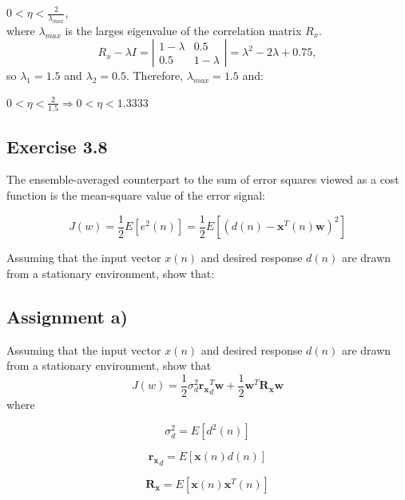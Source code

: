 \documentclass[a4paper, 12pt]{article}
\begin{document}
$0 < \eta < \frac{2}{\lambda_{max}}$,\\
where $\lambda_{max}$ is the larges eigenvalue of the correlation matrix $R_x$.\\

 \[ R_x - \lambda I = \left| \begin{array}{ccc}
1 - \lambda & 0.5 \\
0.5 & 1 - \lambda \end{array} \right| = \lambda^2 - 2\lambda + 0.75,\]
so $\lambda_1 = 1.5$ and $\lambda_2 = 0.5$. Therefore, $\lambda_{max} = 1.5$ and:

$0 < \eta < \frac{2}{1.5} \Rightarrow 0 < \eta < 1.3333$

\subsection{Exercise 3.8}
The ensemble-averaged counterpart to the sum of error squares viewed as a cost function is the mean-square value
of the error signal:

\begin{equation*}
J(w) = \frac{1}{2}E[e^2(n)] = \frac{1}{2}E[(d(n) - \mathbf{x}^T(n)\mathbf{w})^2]
\end{equation*}

Assuming that the input vector $x(n)$ and desired response $d(n)$ are drawn from a stationary environment, show that:


\subsection*{Assignment a)}
Assuming that the input vector $x(n)$ and desired response $d(n)$ are drawn from a stationary environment, show that
    \begin{equation*}
        J(w) = \frac{1}{2}\sigma^2_d\mathbf{r_x}_d^T\mathbf{w}+
        \frac{1}{2}\mathbf{w}^T\mathbf{R_x}\mathbf{w}
    \end{equation*}
    where

    \begin{equation*}
        \sigma_d^2 = E[d^2(n)]
    \end{equation*}


    \begin{equation*}
        \mathbf{r_x}_d = E[\mathbf{x}(n)d(n)]
    \end{equation*}

    \begin{equation*}
        \mathbf{R_x} = E[\mathbf{x}(n)\mathbf{x}^T(n)]
    \end{equation*}
\end{document}
